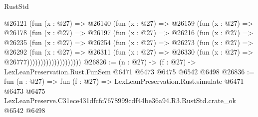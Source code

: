 \begin{lexlean}{RustStd}
\begin{coremodule}
                  @26121
                    (fun (x : @27) =>
                    @26140
                      (fun (x : @27) =>
                      @26159
                        (fun (x : @27) =>
                        @26178
                          (fun (x : @27) =>
                          @26197
                            (fun (x : @27) =>
                            @26216
                              (fun (x : @27) =>
                              @26235
                                (fun (x : @27) =>
                                @26254
                                  (fun (x : @27) =>
                                  @26273
                                    (fun (x : @27) =>
                                    @26292
                                      (fun (x : @27) =>
                                      @26311
                                        (fun (x : @27) =>
                                        @26330 (fun (x : @27) => @26777))))))))))))))))))))
@26826 := (n : @27) -> (f : @27) -> LexLeanPreservation.Rust.FunSem @6471 @6473 @6475 @6542 @6498
@26836 := fun (n : @27) =>
  fun (f : @27) =>
  LexLeanPreservation.Rust.simulate
    @6471
    @6473
    @6475
    LexLeanPreserve.C31ece431dfcfc7678999cdf44be36a94.R3.RustStd.crate_ok
    @6542
    @6498
\end{coremodule}
\end{lexlean}
